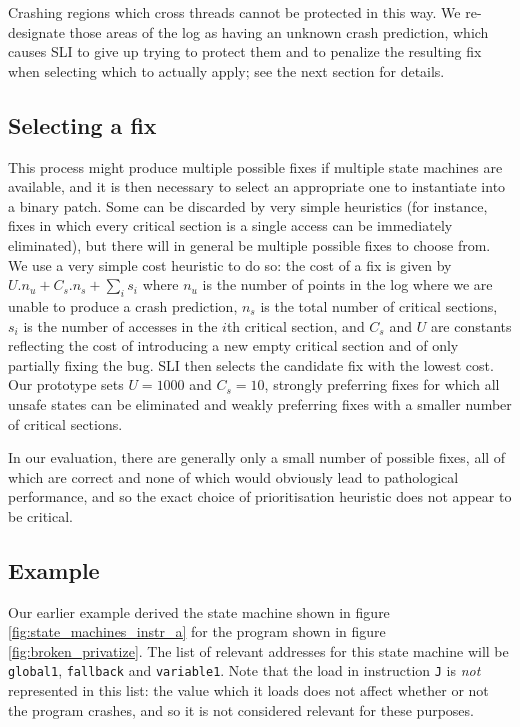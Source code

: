 \documentclass[10pt,twocolumn,preprint,natbib,authoryear]{sigplanconf}
\begin{document}
Crashing regions which cross threads cannot be protected in this way.
We re-designate those areas of the log as having an unknown crash
prediction, which causes SLI to give up trying to protect them and to
penalize the resulting fix when selecting which to actually apply; see
the next section for details.


\subsection{Selecting a fix}
\label{sect:selectfix}

This process might produce multiple possible fixes if multiple state
machines are available, and it is then necessary to select an
appropriate one to instantiate into a binary patch.  Some can be
discarded by very simple heuristics (for instance, fixes in which
every critical section is a single access can be immediately
eliminated), but there will in general be multiple possible fixes to
choose from.  We use a very simple cost heuristic to do so: the cost
of a fix is given by $U.n_u + C_s.n_s + {\sum_{i}}s_i$ where $n_u$ is
the number of points in the log where we are unable to produce a crash
prediction, $n_s$ is the total number of critical sections, $s_i$ is
the number of accesses in the $i$th critical section, and $C_s$ and
$U$ are constants reflecting the cost of introducing a new empty
critical section and of only partially fixing the bug.  SLI then
selects the candidate fix with the lowest cost.  Our prototype sets
$U=1000$ and $C_s=10$, strongly preferring fixes for which all unsafe
states can be eliminated and weakly preferring fixes with a smaller
number of critical sections.

In our evaluation, there are generally only a small number of possible
fixes, all of which are correct and none of which would obviously lead
to pathological performance, and so the exact choice of prioritisation
heuristic does not appear to be critical.

\subsection{Example}
\label{sect:final_example}

Our earlier example derived the state machine shown in figure
\ref{fig:state_machines_instr_a} for the program shown in figure
\ref{fig:broken_privatize}.  The list of relevant addresses for this
state machine will be \verb|global1|, \verb|fallback| and
\verb|variable1|.  Note that the load in instruction \verb|J| is
\emph{not} represented in this list: the value which it loads does not
affect whether or not the program crashes, and so it is not considered
relevant for these purposes.
\end{document}
